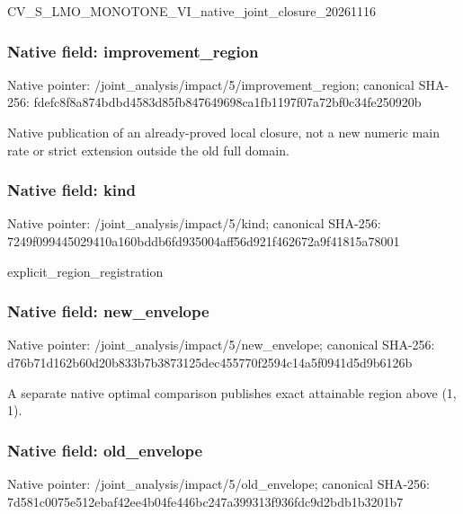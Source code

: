 \documentclass[10pt,a4paper]{article}
\begin{document}
\begingroup\raggedright\sloppy CV\_\allowbreak{}S\_\allowbreak{}LMO\_\allowbreak{}MONOTONE\_\allowbreak{}VI\_\allowbreak{}native\_\allowbreak{}joint\_\allowbreak{}closure\_\allowbreak{}20261116\par\endgroup

\subsubsection{Native field: improvement\_\allowbreak{}region}
Native pointer: /joint\_\allowbreak{}analysis/impact/5/improvement\_\allowbreak{}region; canonical SHA-256: fdefc8f8a874bdbd4583d85fb847649698ca1fb1197f07a72bf0c34fe250920b

\begingroup\raggedright\sloppy Native publication of an already-proved local closure,\allowbreak{} not a new numeric main rate or strict extension outside the old full domain.\par\endgroup

\subsubsection{Native field: kind}
Native pointer: /joint\_\allowbreak{}analysis/impact/5/kind; canonical SHA-256: 7249f099445029410a160bddb6fd935004aff56d921f462672a9f41815a78001

\begingroup\raggedright\sloppy explicit\_\allowbreak{}region\_\allowbreak{}registration\par\endgroup

\subsubsection{Native field: new\_\allowbreak{}envelope}
Native pointer: /joint\_\allowbreak{}analysis/impact/5/new\_\allowbreak{}envelope; canonical SHA-256: d76b71d162b60d20b833b7b3873125dec455770f2594c14a5f0941d5d9b6126b

\begingroup\raggedright\sloppy A separate native optimal comparison publishes exact attainable region above (1,\allowbreak{} 1).\par\endgroup

\subsubsection{Native field: old\_\allowbreak{}envelope}
Native pointer: /joint\_\allowbreak{}analysis/impact/5/old\_\allowbreak{}envelope; canonical SHA-256: 7d581c0075e512ebaf42ee4b04fe446bc247a399313f936fdc9d2bdb1b3201b7
\end{document}
